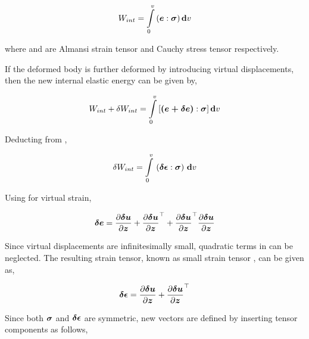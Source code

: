 \begin{equation}
  W_{int}=\gint{0}{v}{(\vect{e}:\vect{\sigma})}v
  \label{eqn:totalenergy}
\end{equation}

where  and \vect{\sigma} are Almansi strain tensor and Cauchy stress
tensor respectively.

If the deformed body is further deformed by introducing virtual displacements,
then the new internal elastic energy can be given by,

\begin{equation}
  {W_{int}+\delta W_{int}}=\gint{0}{v}{[\vect{(e+\delta{e})}:\vect{\sigma}]}v
  \label{eqn:virtualtotalenergy}
\end{equation}

Deducting  from ,

\begin{equation}
  \delta W_{int}=\gint{0}{v}{\pbrac{\vect{\delta \epsilon} : \vect{\sigma}}}v
  \label{eqn:virtualenergy}
\end{equation}

Using  for virtual strain,

\begin{equation}
  \vect{\delta e}=\delby{\vect{\delta u}}{\vect{z}} + \transpose{\delby{\vect{\delta u}}{\vect{z}}} + 
                  \transpose{\delby{\vect{\delta u}}{\vect{z}}}\delby{\vect{\delta u}}{\vect{z}}
  \label{eqn:virtualalmansidisplacement}
\end{equation}

Since virtual displacements are infinitesimally small, quadratic terms in
 can be neglected.  The resulting
strain tensor, known as small strain tensor \vect{\epsilon}, can be given as,

\begin{equation}
  \vect{\delta \epsilon}=\delby{\vect{\delta u}}{\vect{z}} + \transpose{\delby{\vect{\delta u}}{\vect{z}}} 
  \label{eqn:virtualsmalldisplacement}
\end{equation}
 
Since both $\vect{\sigma}$ and $\vect{\delta \epsilon}$ are symmetric, new
vectors are defined by inserting tensor components as follows,

